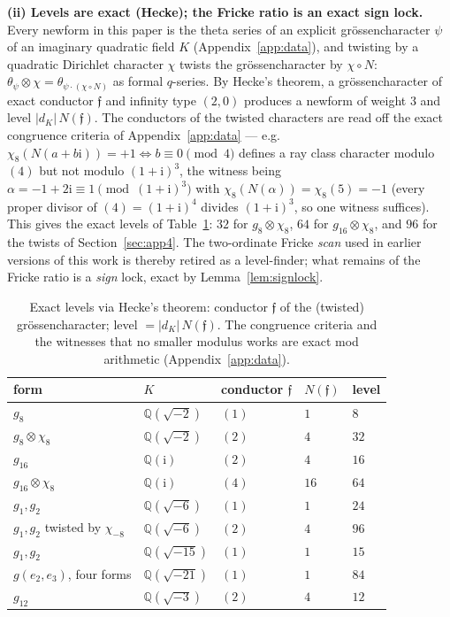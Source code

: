\documentclass[11pt]{article}
\newcommand{\Qq}{\mathbb{Q}}
\newcommand{\ii}{\mathrm{i}}
\theoremstyle{definition}
\theoremstyle{remark}
\begin{document}
\textbf{(ii) Levels are exact (Hecke); the Fricke ratio is an exact
sign lock.} Every newform in this paper is the theta series of an
explicit grössencharacter $\psi$ of an imaginary quadratic field $K$
(Appendix~\ref{app:data}), and twisting by a quadratic Dirichlet
character $\chi$ twists the grössencharacter by $\chi\circ N$:
$\theta_\psi\otimes\chi=\theta_{\psi\cdot(\chi\circ N)}$ as formal
$q$-series. By Hecke's theorem, a grössencharacter of exact conductor
$\mathfrak{f}$ and infinity type $(2,0)$ produces a newform of weight
$3$ and level $|d_K|\,N(\mathfrak{f})$. The conductors of the twisted
characters are read off the exact congruence criteria of
Appendix~\ref{app:data} --- e.g.\ $\chi_8(N(a+b\ii))=+1\iff
b\equiv0\pmod4$ defines a ray class character modulo $(4)$ but not
modulo $(1+\ii)^3$, the witness being
$\alpha=-1+2\ii\equiv1\pmod{(1+\ii)^3}$ with
$\chi_8(N(\alpha))=\chi_8(5)=-1$ (every proper divisor of
$(4)=(1+\ii)^4$ divides $(1+\ii)^3$, so one witness suffices). This gives the exact levels of
Table~\ref{tab:levels}: $32$ for $g_8\otimes\chi_8$, $64$ for
$g_{16}\otimes\chi_8$, and $96$ for the twists of
Section~\ref{sec:app4}. The two-ordinate Fricke \emph{scan} used in
earlier versions of this work is thereby retired as a level-finder;
what remains of the Fricke ratio is a \emph{sign} lock, exact by
Lemma~\ref{lem:signlock}.

\begin{table}[ht]
\centering\small
\caption{Exact levels via Hecke's theorem: conductor $\mathfrak{f}$ of
the (twisted) grössencharacter; level $=|d_K|\,N(\mathfrak{f})$. The
congruence criteria and the witnesses that no smaller modulus works
are exact mod arithmetic (Appendix~\ref{app:data}).}
\label{tab:levels}
\begin{tabular}{lllll}
\toprule
form & $K$ & conductor $\mathfrak{f}$ & $N(\mathfrak{f})$ & level\\
\midrule
$g_8$                          & $\Qq(\sqrt{-2})$  & $(1)$ & $1$  & $8$\\
$g_8\otimes\chi_8$             & $\Qq(\sqrt{-2})$  & $(2)$ & $4$  & $32$\\
$g_{16}$                       & $\Qq(\ii)$        & $(2)$ & $4$  & $16$\\
$g_{16}\otimes\chi_8$          & $\Qq(\ii)$        & $(4)$ & $16$ & $64$\\
$g_1,g_2$                      & $\Qq(\sqrt{-6})$  & $(1)$ & $1$  & $24$\\
$g_1,g_2$ twisted by $\chi_{-8}$ & $\Qq(\sqrt{-6})$ & $(2)$ & $4$ & $96$\\
$g_1,g_2$                      & $\Qq(\sqrt{-15})$ & $(1)$ & $1$  & $15$\\
$g(e_2,e_3)$, four forms       & $\Qq(\sqrt{-21})$ & $(1)$ & $1$  & $84$\\
$g_{12}$                       & $\Qq(\sqrt{-3})$  & $(2)$ & $4$  & $12$\\
\bottomrule
\end{tabular}
\end{table}
\end{document}
